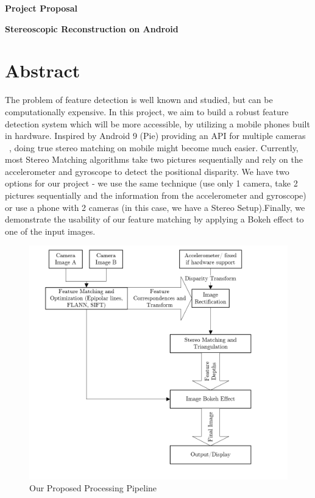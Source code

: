 \documentclass[a4paper,pagesize 10pt]{scrartcl}
\begin{document}
\begin{center}{\Huge\textbf{Project Proposal}}\end{center}

\begin{center}{\Large\textbf{Stereoscopic Reconstruction on Android}}\end{center}


\section{Abstract}

%
%
%
%
%
The problem of feature detection is well known and studied, but can be computationally expensive. In this project, we aim to build a robust feature detection system which will be more accessible, by utilizing a mobile phones built in hardware. Inspired by Android 9 (Pie)
providing an API for multiple cameras ~\cite{AndroidPMultiCamera}, doing true stereo matching on mobile might become much easier. Currently, most Stereo Matching algorithms take two pictures sequentially and rely on the accelerometer and gyroscope to detect the positional disparity. We have two options for our project - we use the same technique (use only 1 camera, take 2 pictures sequentially and the information from the accelerometer and gyroscope) or use a phone with 2 cameras (in this case, we have a Stereo Setup).Finally, we demonstrate the usability of our feature matching by applying a Bokeh effect to one of the input images.
\begin{figure}[h]
	\centering
	\includegraphics[scale=0.55]{Pipeline.PNG}
	\caption{Our Proposed Processing Pipeline}
\end{figure}
\end{document}
